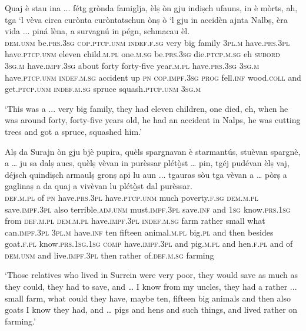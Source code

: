 \begin{linenumbers}
\gll Quaj è stau ina ... fétg grònda famiglja, èlṣ òn gju indiṣch ufauns, in è mòrts, ah, tga `l vèva circa curònta curòntatschun ònṣ ò `l gju in accidèn ajnta Nalbṣ, èra vida ... piná lèna, a survagnú in pégn, schmacau èl.   \\
  \textsc{dem.unm}  be.\textsc{prs.3sg}  \textsc{cop.ptcp.unm}  \textsc{indef.f.sg} {} very big family \textsc{3pl.m} have.\textsc{prs.3pl} have.\textsc{ptcp.unm} eleven child.\textsc{m.pl} one.\textsc{m.sg} be.\textsc{prs.3sg} die.\textsc{ptcp.m.sg} eh \textsc{subord} \textsc{3sg.m} have.\textsc{impf.3sg} about forty forty-five year.\textsc{m.pl} have.\textsc{prs.3sg} \textsc{3sg.m} have.\textsc{ptcp.unm} \textsc{indef.m.sg} accident up \textsc{pn} \textsc{cop.impf.3sg} \textsc{prog} {} fell.\textsc{inf} wood.\textsc{coll} and get.\textsc{ptcp.unm} \textsc{indef.m.sg} spruce squash.\textsc{ptcp.unm} \textsc{3sg.m} \\
\end{linenumbers}
\medskip
\glt `This was a ... very big family, they had eleven children, one died, eh, when he was around forty, forty-five years old, he had an accident in Nalps, he was cutting trees and got a spruce, squashed him.'
\medskip

\begin{linenumbers}
\gll   Alṣ da Surajn òn gju bjè pupira, quèls spargnavan è starmantús, stuèvan spargnè, a … ju sa dalṣ aucs, quèlṣ vèvan in purèssar plétò̱st … pin, tgéj pudévan èlṣ vaj, déjsch quindiṣch armaulṣ gronṣ api lu aun ... tgauras sòu tga vèvan a … pòrṣ a gaglinaṣ a da quaj a vivèvan lu plétò̱st dal purèssar. \\
 \textsc{def.m.pl} of \textsc{pn} have.\textsc{prs.3pl} have.\textsc{ptcp.unm} much poverty.\textsc{f.sg} \textsc{dem.m.pl} save.\textsc{impf.3pl} also terrible.\textsc{adj.unm} must.\textsc{impf.3pl} save.\textsc{inf} and  {} \textsc{1sg} know.\textsc{prs.1sg} from \textsc{def.m.pl} \textsc{dem.m.pl} have.\textsc{impf.3pl} \textsc{indef.m.sg} farm rather {} small what can.\textsc{impf.3pl} \textsc{3pl.m} have.\textsc{inf} ten fifteen animal.\textsc{m.pl} big.\textsc{pl} and then besides {} goat.\textsc{f.pl} know.\textsc{prs.1sg.1sg} \textsc{comp} have.\textsc{impf.3pl} and {} pig.\textsc{m.pl} and hen.\textsc{f.pl} and of \textsc{dem.unm} and live.\textsc{impf.3pl} then rather of.\textsc{def.m.sg} farming\\
\end{linenumbers}
\medskip
\glt `Those relatives who lived in Surrein were very poor, they would save as much as they  could, they had to save, and … I know from my uncles, they had a rather ... small farm, what could they have, maybe ten, fifteen big animals and then also goats I know they had, and … pigs and hens and such things, and lived rather on farming.'
\medskip

